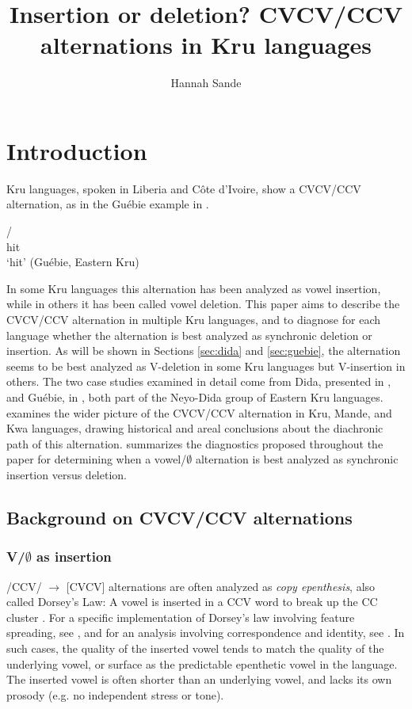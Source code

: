 \documentclass[output=paper,colorlinks,citecolor=brown]{langscibook}
\author{Hannah Sande\orcid{0000-0003-1335-8717}\affiliation{UC Berkeley}}
\title{Insertion or deletion? CVCV/CCV alternations in Kru languages}
\begin{document}
\maketitle 
\label{ch2}

\section{Introduction}\label{sec:intro} 
Kru languages, spoken in Liberia and Côte d'Ivoire, show a CVCV\slash CCV alternation, as in the Guébie example in .

\ea \label{gex}
\gll {}/\\
hit\\
\glt `hit'  (Guébie, Eastern Kru)
\z

In some Kru languages this alternation has been analyzed as vowel insertion, while in others it has been called vowel deletion. This paper aims to describe the CVCV\slash CCV alternation in multiple Kru languages, and to diagnose for each language whether the alternation is best analyzed as synchronic deletion or insertion. As will be shown in Sections \ref{sec:dida} and \ref{sec:guebie}, the alternation seems to be best analyzed as V-deletion in some Kru languages but V-insertion in others. The two case studies examined in detail come from Dida, presented in , and Guébie, in , both part of the Neyo-Dida group of Eastern Kru languages.  examines the wider picture of the CVCV\slash CCV alternation in Kru, Mande, and Kwa languages, drawing historical and areal conclusions about the diachronic path of this alternation.  summarizes the diagnostics proposed throughout the paper for determining when a vowel/$\emptyset$ alternation is best analyzed as synchronic insertion versus deletion.

\subsection{Background on CVCV/CCV alternations}\label{sec:cvcvintro}
\subsubsection{V/$\emptyset$ as insertion}\label{sec:epenthesis}

/CCV/ $\rightarrow$ [CVCV] alternations are often analyzed as \textit{copy epenthesis}, also called Dorsey's Law: A vowel is inserted in a CCV word to break up the CC cluster \citep{Miner:1979, Miner:1989, Hale&WhiteEagle, Hayes:1995, Clements:1986, Clements:1991, Halle:2000, Kawahara:2007, StantonZukoff2018}. For a specific implementation of Dorsey's law involving feature spreading, see \citet{Kawahara:2007}, and for an analysis involving correspondence and identity, see \citet{StantonZukoff2018}.  In such cases, the quality of the inserted vowel tends to match the quality of the underlying vowel, or surface as the predictable epenthetic vowel in the language. The inserted vowel is often shorter than an underlying vowel, and lacks its own prosody (e.g. no independent stress or tone). 
\end{document}
